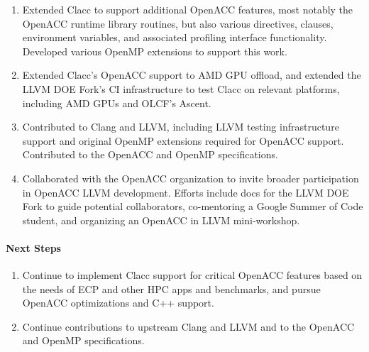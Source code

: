 \begin{enumerate}
\item
  Extended Clacc to support additional OpenACC features, most notably
  the OpenACC runtime library routines, but also various directives,
  clauses, environment variables, and associated profiling interface
  functionality.  Developed various OpenMP extensions to support this
  work.
\item
  Extended Clacc's OpenACC support to AMD GPU offload, and extended
  the LLVM DOE Fork's CI infrastructure to test Clacc on relevant
  platforms, including AMD GPUs and OLCF's Ascent.
\item
  Contributed to Clang and LLVM, including LLVM testing infrastructure
  support and original OpenMP extensions required for OpenACC support.
  Contributed to the OpenACC and OpenMP specifications.
\item
  Collaborated with the OpenACC organization to invite broader
  participation in OpenACC LLVM development.  Efforts include docs for
  the LLVM DOE Fork to guide potential collaborators, co-mentoring a
  Google Summer of Code student, and organizing an OpenACC in LLVM
  mini-workshop.
\end{enumerate}


\paragraph{Next Steps}

\begin{enumerate}
\item
  Continue to implement Clacc support for critical OpenACC features
  based on the needs of ECP and other HPC apps and benchmarks, and
  pursue OpenACC optimizations and C++ support.
\item
  Continue contributions to upstream Clang and LLVM and to the OpenACC
  and OpenMP specifications.
\end{enumerate}
